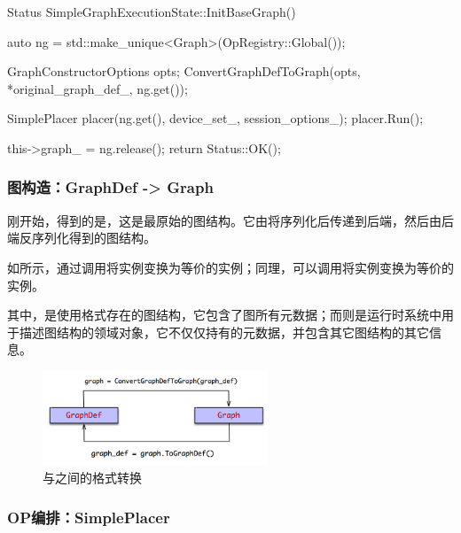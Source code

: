 \begin{content}
\begin{leftbar}
\begin{c++}
Status SimpleGraphExecutionState::InitBaseGraph() {
  auto ng = std::make_unique<Graph>(OpRegistry::Global());

  GraphConstructorOptions opts;
  ConvertGraphDefToGraph(opts, *original_graph_def_, ng.get());

  SimplePlacer placer(ng.get(), device_set_, session_options_);
  placer.Run();

  this->graph_ = ng.release();
  return Status::OK();
}
\end{c++}
\end{leftbar}

\subsubsection{图构造：GraphDef -> Graph}

刚开始，得到的是，这是最原始的图结构。它由将序列化后传递到后端，然后由后端反序列化得到的图结构。

如所示，通过调用将实例变换为等价的实例；同理，可以调用将实例变换为等价的实例。

其中，是使用格式存在的图结构，它包含了图所有元数据；而则是运行时系统中用于描述图结构的领域对象，它不仅仅持有的元数据，并包含其它图结构的其它信息。

\begin{figure}[H]
\centering
\includegraphics[width=0.6\textwidth]{figures/local-graph-def-to-graph.png}
\caption{与之间的格式转换}
 \label{fig:local-graph-def-to-graph}
\end{figure}

\subsubsection{OP编排：SimplePlacer}


\end{content}
